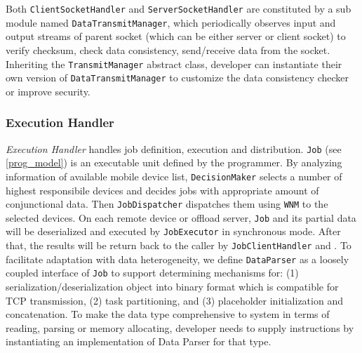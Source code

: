 \documentclass{sig-alternate}[10pt]
\begin{document}

Both \texttt{ClientSocketHandler} and \texttt{ServerSocketHandler} are constituted by a sub module named \texttt{DataTransmitManager}, which periodically observes input and output streams of parent socket (which can be either server or client socket) to verify checksum, check data consistency, send/receive data from the socket. Inheriting the \texttt{TransmitManager} abstract class, developer can instantiate their own version of \texttt{DataTransmitManager} to customize the data consistency checker or improve security. 

\subsubsection{Execution Handler}
\emph{Execution Handler} handles job definition, execution and distribution. \texttt{Job} (see \ref{prog_model}) is an executable unit defined by the programmer. By analyzing information of available mobile device list, \texttt{DecisionMaker} selects a number of highest responsibile devices and decides jobs with appropriate amount of conjunctional data. Then \texttt{JobDispatcher} dispatches them using \texttt{WNM} to the selected devices. On each remote device or offload server, \texttt{Job} and its partial data will be deserialized and executed by \texttt{JobExecutor} in synchronous mode. After that, the results will be return back to the caller by \texttt{JobClientHandler} and . To facilitate adaptation with data heterogeneity, we define \texttt{DataParser} as a loosely coupled interface of \texttt{Job} to support determining mechanisms for: (1) serialization/deserialization object into binary format which is compatible for TCP transmission, (2) task partitioning, and (3) placeholder initialization and concatenation. To make the data type comprehensive to system in terms of reading, parsing or memory allocating, developer needs to supply instructions by instantiating an implementation of Data Parser for that type. 
\end{document}
